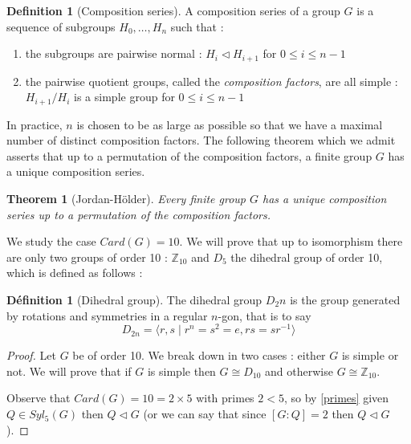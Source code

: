 \documentclass{article}
\theoremstyle{definition}
\newtheorem{definition}[subsubsection]{Définition}
\theoremstyle{plain}
\theoremstyle{plain}
\theoremstyle{plain}
\theoremstyle{plain}
\theoremstyle{definition}
\newtheorem{defeng}[subsubsection]{Definition}
\theoremstyle{plain}
\newtheorem{thmeng}[subsubsection]{Theorem}
\theoremstyle{plain}
\newtheorem{propeng}[subsubsection]{Proposition}
\begin{document}
\begin{defeng}[Composition series]
	A composition series of a group \( G \) is a sequence of subgroups \( H_0, \ldots, H_n \) such that :
	\begin{enumerate}[label = (\roman*)]
	\item the subgroups are pairwise normal : 
		\( H_i \triangleleft H_{i+1} \) for \( 0 \leq i \leq n-1 \)
	\item the pairwise quotient groups, called the \textit{composition factors}, are all simple :
		\( H_{i+1}/H_{i} \) is a simple group for \( 0 \leq i \leq n-1 \)

	\end{enumerate}
\par In practice, \( n \) is chosen to be as large as possible so that we have
a maximal number of distinct composition factors. The following theorem which we admit asserts that up to a permutation of the composition factors, a finite group \( G \) has a unique composition series.

\begin{thmeng}[Jordan-Hölder]
	Every finite group \( G \) has a unique composition series up to a permutation of the composition factors.	
\end{thmeng}
\end{defeng}

\par We study the case \( Card(G) = 10 \). We will prove that up to isomorphism there are only two groups of order 10 : \( \mathbb{Z}_{10} \) and \( D_5 \) the dihedral group of order 10, which is defined as follows :

\begin{definition}[Dihedral group]
	The dihedral group \( D_2n \) is the group generated by rotations and symmetries in a regular \(n\)-gon, that is to say 
	\begin{equation*}
		D_{2n} = \langle r,s \mid r^{n} = s^{2} = e, rs = sr^{-1} \rangle 
	\end{equation*}
\end{definition}

\begin{proof}
	Let \( G \) be of order 10. We break down in two cases : either \( G \) is simple or not. We will prove that if \( G \) is simple then \( G \cong D_10 \) and otherwise \( G \cong \mathbb{Z}_{10} \).

	Observe that \( Card(G) = 10 = 2 \times 5 \) with primes \( 2 < 5\), so by \cref{primes} given \( Q \in Syl_5(G) \) then \( Q \triangleleft G \) (or we can say that since \( [G:Q] = 2 \) then \( Q \triangleleft G \)).
\end{proof} 


	

\clearpage

\printbibliography
\end{document}
